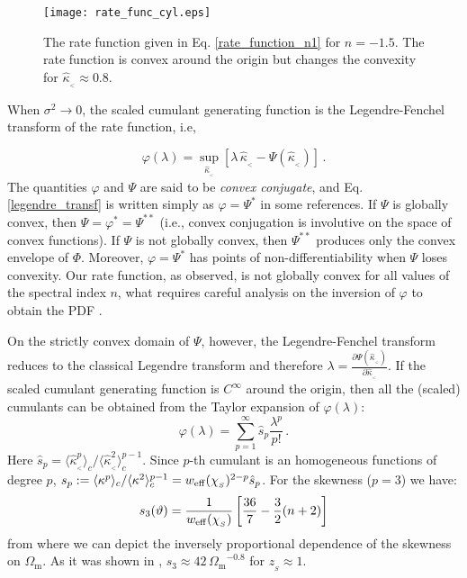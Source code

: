 \documentclass[twocolumn,aps,reprint, nofootinbib]{revtex4}
\newcommand{\Omegam}{{\Omega_\mathrm{m}}}
\newcommand{\eff}{{\rm eff}}
\newcommand{\w}{{w_{\eff}}}
\newcommand{\hkappa}{\hat{\kappa}_{_<}}
\begin{document}
\begin{figure}[!ht]
\centering
\texttt{[image: rate\_func\_cyl.eps]}
\caption{The rate function given in Eq. \eqref{rate_function_n1} for $n=-1.5$. The rate function is convex around the origin but changes the convexity for $\hkappa \approx 0.8$.}
\label{rate_func_cyl}
\end{figure}

When $\sigma^2 \to 0$, the scaled cumulant generating function is the Legendre-Fenchel transform of the rate function, i.e, 

\begin{equation}
\label{legendre_transf}
\varphi(\lambda) = \sup_{\hkappa} \left[ \lambda \, \hkappa - \Psi(\hkappa) \right] \, .
\end{equation}
The quantities $\varphi$ and $\Psi$ are said to be \emph{convex conjugate}, and Eq. \eqref{legendre_transf} is written simply as $\varphi = \Psi^*$ in some references. If $\Psi$ is globally convex, then $\Psi = \varphi^* = \Psi^{**}$ (i.e., convex conjugation is involutive on the space of convex functions). If $\Psi$ is not globally convex, then $\Psi^{**}$ produces only the convex envelope of $\Phi$. Moreover, $\varphi=\Psi^*$ has points of non-differentiability when $\Psi$ loses convexity. Our rate function, as observed, is not globally convex for all values of the spectral index $n$, what requires careful analysis on the inversion of $\varphi$ to obtain the PDF \cite{bernardeau2014statistics, uhlemann2016back}.

On the strictly convex domain of $\Psi$, however, the Legendre-Fenchel transform reduces to the classical Legendre transform and therefore $\lambda = \frac{\partial \Psi(\hkappa)}{\partial \hkappa}$. If the scaled cumulant generating function is $C^{\infty}$ around the origin, then all the (scaled) cumulants can be obtained from the Taylor expansion of $\varphi(\lambda)$:
\begin{equation}
\label{taylor_cum}
\varphi(\lambda) = \sum_{p=1}^{\infty} \hat{s}_p \frac{\lambda^p}{p!} \, .
\end{equation}
Here $\hat{s}_p = \langle \hkappa^p \rangle_c / \langle \hkappa^2 \rangle_c^{p-1}$. Since $p$-th cumulant is an homogeneous functions of degree $p$, $s_p := \langle \kappa^p \rangle_c / \langle \kappa^2 \rangle_c^{p-1} = \w(\chi_{_S})^{2-p} \hat{s}_p$. For the skewness ($p=3$) we have:
\begin{equation}
\label{s3th}
s_3(\vartheta) = \frac{1}{\w(\chi_{_S})} \left[\frac{36}{7} - \frac{3}{2}(n + 2) \right]
\end{equation}
from where we can depict the inversely proportional dependence of the skewness on $\Omegam$. As it was shown in \cite{Bernardeau:1996un}, $s_3 \approx 42 \, \Omegam^{-0.8}$ for $z_{_S} \approx 1$.
\end{document}
